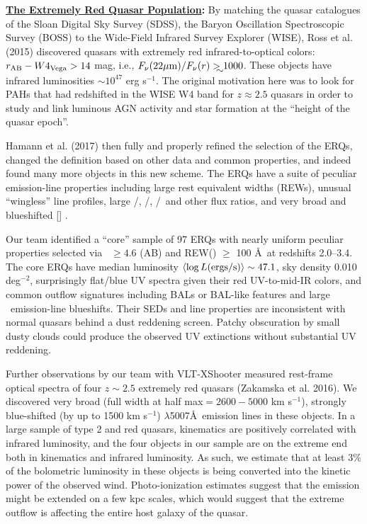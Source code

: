\medskip
\medskip

\smallskip
\smallskip
\noindent
{\bf \underline{The Extremely Red Quasar Population}:}
By matching the quasar catalogues of the Sloan Digital Sky Survey
(SDSS), the Baryon Oscillation Spectroscopic Survey (BOSS) to the
Wide-Field Infrared Survey Explorer (WISE), Ross et al. (2015)
discovered quasars with extremely red infrared-to-optical colors:
$r_{\rm AB}-W4_{\rm Vega}>14$ mag, i.e., $F_\nu({\rm 22\mu
m})/F_\nu(r) \gtrsim 1000$.  These objects have infrared luminosities
$\sim 10^{47}$ erg s$^{-1}$.  The original motivation here was to look
for PAHs that had redshifted in the WISE W4 band for $z\approx2.5$ 
quasars in order to study and link luminous AGN activity and star
formation at the ``height of the quasar epoch''.

\smallskip
\smallskip
\noindent
Hamann et al. (2017) then fully and properly refined the selection of
the ERQs, changed the definition based on other data and common
properties, and indeed found many more objects in this new scheme. The
ERQs have a suite of peculiar emission-line properties including large
rest equivalent widths (REWs), unusual ``wingless'' line profiles,
large \nv /\lya , \nv /\civ , \siiv /\civ\ and other flux ratios, and
very broad and blueshifted [\oiii ] .

\smallskip
\smallskip
\noindent
Our team identified a ``core'' sample of 97 ERQs
with nearly uniform peculiar properties selected via \imw\ $\ge 4.6$
(AB) and REW(\civ ) $\ge$ 100 \AA\ at redshifts 2.0--3.4. 
 The core ERQs have median luminosity $\left<\log L
({\rm ergs/s})\right> \sim 47.1$, sky density 0.010 deg$^{-2}$,
surprisingly flat/blue UV spectra given their red UV-to-mid-IR colors,
and common outflow signatures including BALs or BAL-like features and
large \civ\ emission-line blueshifts. Their SEDs and line properties
are inconsistent with normal quasars behind a dust reddening
screen. Patchy obscuration by small dusty clouds
could produce the observed UV extinctions without substantial UV
reddening.

\smallskip
\smallskip
\noindent
Further observations by our team with VLT-XShooter measured rest-frame
optical spectra of four $z\sim 2.5$ extremely red quasars (Zakamska et al. 2016).  
We discovered very broad (full width at half max$= 2600-5000$ km
s$^{-1}$), strongly blue-shifted (by up to 1500 km s$^{-1}$)
\oiii$\lambda$5007\AA\ emission lines in these objects. In a large
sample of type 2 and red quasars, \oiii kinematics are positively
correlated with infrared luminosity, and the four objects in our
sample are on the extreme end both in \oiii kinematics and infrared
luminosity.
As such, we estimate that at least 3\% of the bolometric luminosity in
these objects is being converted into the kinetic power of the
observed wind. Photo-ionization estimates suggest that the \oiii
emission might be extended on a few kpc scales, which would suggest
that the extreme outflow is affecting the entire host galaxy of the
quasar.

